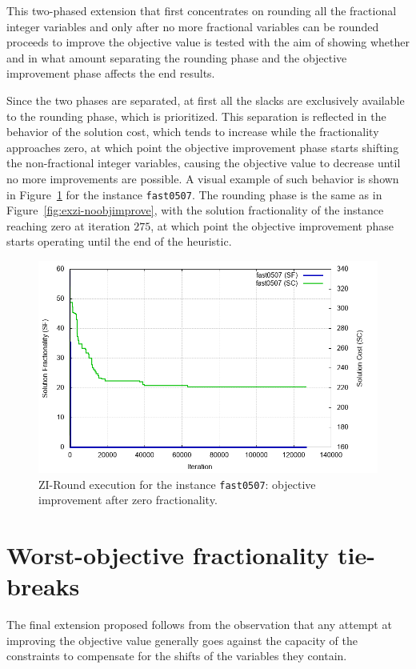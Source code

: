 \documentclass[a4paper,12pt]{book}
\begin{document}
This two-phased extension that first concentrates on rounding all the fractional integer variables and only after no more fractional variables can be rounded proceeds to improve the objective value is tested with the aim of showing whether and in what amount separating the rounding phase and the objective improvement phase affects the end results. \par 

Since the two phases are separated, at first all the slacks are exclusively available to the rounding phase, which is prioritized. This separation is reflected in the behavior of the solution cost, which tends to increase while the fractionality approaches zero, at which point the objective improvement phase starts shifting the non-fractional integer variables, causing the objective value to decrease until no more improvements are possible. A visual example of such behavior is shown in Figure~\ref{fig:exzi-objimproveafter0frac} for the instance \texttt{fast0507}. The rounding phase is the same as in Figure~\ref{fig:exzi-noobjimprove}, with the solution fractionality of the instance reaching zero at iteration $275$, at which point the objective improvement phase starts operating until the end of the heuristic.
\begin{figure}[ht]
	\centering
	\includegraphics[width=\textwidth]{fast0507-shiftnfafter0frac.png}
	\caption{ZI-Round execution for the instance \texttt{fast0507}: objective improvement after zero fractionality.}
	\label{fig:exzi-objimproveafter0frac}
\end{figure}

\section{Worst-objective fractionality tie-breaks}
The final extension proposed follows from the observation that any attempt at improving the objective value generally goes against the capacity of the constraints to compensate for the shifts of the variables they contain. \par 
\end{document}

